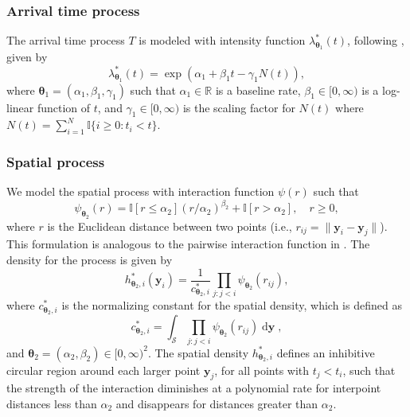 \subsubsection{Arrival time process}\label{arrival-time-process}

The arrival time process \(T\) is modeled with intensity function
\(\lambda_{\boldsymbol{\theta}_1}^*(t )\), following
\citet{mollerMechanisticSpatiotemporalPoint2016a}, given by \[
\lambda_{\boldsymbol{\theta}_1}^*(t) =  \exp(\alpha_1 +  \beta_1 t - \gamma_1 N(t)),
\] where \(\boldsymbol{\theta}_1 = (\alpha_1, \beta_1, \gamma_1)\) such
that \(\alpha_1 \in \mathbb{R}\) is a baseline rate,
\(\beta_1 \in [0, \infty)\) is a log-linear function of \(t\), and
\(\gamma_1 \in [0, \infty)\) is the scaling factor for \(N(t)\) where
\(N(t) = \sum_{i = 1}^N\mathbb{I}\{i \geq 0: t_i < t \}\).

\subsubsection{Spatial process}\label{spatial-process}

We model the spatial process with interaction function \(\psi(r)\) such
that \[
\psi_{\boldsymbol{\theta}_2}(r) = \mathbb{I}[r \leq \alpha_2] (r/\alpha_2)^{\beta_2} + \mathbb{I}[r > \alpha_2], \quad r\geq 0,
\] where \(r\) is the Euclidean distance between two points (i.e.,
\(r_{ij} = \lVert \boldsymbol{y}_i - \boldsymbol{y}_j \rVert\)). This
formulation is analogous to the pairwise interaction function in
\citet{diggleMonteCarloMethods1984}. The density for the process is given by
\begin{equation}
h_{\boldsymbol{\theta}_2,i}^* (\boldsymbol{y}_i) = \frac{1}{c_{\boldsymbol{\theta}_2,i}^*} \prod_{j: j < i} \psi_{\boldsymbol{\theta}_2}(r_{ij}),
  \label{eq:spatialdensity}
\end{equation} where \(c_{\boldsymbol{\theta}_2,i}^*\) is the normalizing
constant for the spatial density, which is defined as \[
c_{\boldsymbol{\theta}_2,i}^* = \int_{\mathscr{S}} \prod_{j: j < i} \psi_{\boldsymbol{\theta}_2}(r_{ij}) \mathop{d\boldsymbol{y}},
\] and \(\boldsymbol{\theta}_2 = (\alpha_2, \beta_2 ) \in [0, \infty)^2\).
The spatial density \(h_{\boldsymbol{\theta}_2,i}^*\) defines an
inhibitive circular region around each larger point \(\boldsymbol{y}_j\),
for all points with \(t_j < t_i\), such that the strength of the
interaction diminishes at a polynomial rate for interpoint distances
less than \(\alpha_2\) and disappears for distances greater than
\(\alpha_2\).

